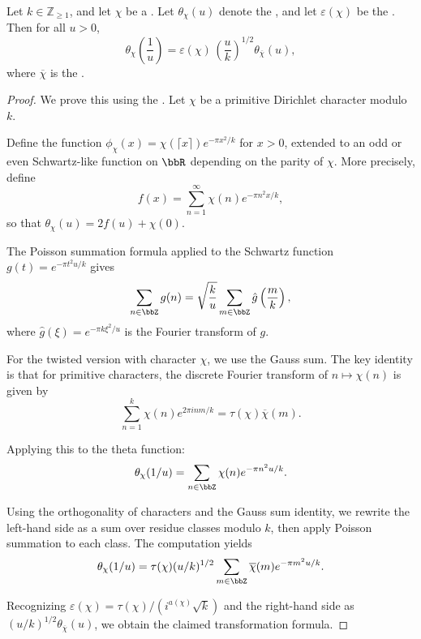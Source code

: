 \begin{lemma} \label{lemma:theta_transformation_formula_for_primitive_dirichlet_characters}
Let $k \in \mathbb{Z}_{\geq 1}$, and let $\chi$ be a . Let $\theta_\chi(u)$ denote the , and let $\varepsilon(\chi)$ be the . Then for all $u > 0$,
$$\theta_\chi\!\left( \frac{1}{u} \right) = \varepsilon(\chi) \, \left( \frac{u}{k} \right)^{\!1/2} \theta_{\overline{\chi}}(u),$$
where $\overline{\chi}$ is the .
\end{lemma}

\begin{proof}
    We prove this using the . Let $\chi$ be a primitive Dirichlet character modulo $k$.

    Define the function $\phi_\chi(x) = \chi(\lceil x \rceil) e^{-\pi x^2 / k}$ for $x > 0$, extended to an odd or even Schwartz-like function on $\bbR$ depending on the parity of $\chi$. More precisely, define
    $$f(x) = \sum_{n=1}^\infty \chi(n) e^{-\pi n^2 x / k},$$
    so that $\theta_\chi(u) = 2f(u) + \chi(0)$.

    The Poisson summation formula applied to the Schwartz function $g(t) = e^{-\pi t^2 u / k}$ gives
    $$\sum_{n \in \bbZ} g(n) = \sqrt{\frac{k}{u}} \sum_{m \in \bbZ} \hat{g}\left(\frac{m}{k}\right),$$
    where $\hat{g}(\xi) = e^{-\pi k \xi^2 / u}$ is the Fourier transform of $g$.

    For the twisted version with character $\chi$, we use the Gauss sum. The key identity is that for primitive characters, the discrete Fourier transform of $n \mapsto \chi(n)$ is given by
    $$\sum_{n=1}^k \chi(n) e^{2\pi i n m / k} = \tau(\chi)\overline{\chi}(m).$$

    Applying this to the theta function:
    $$\theta_\chi(1/u) = \sum_{n \in \bbZ} \chi(n) e^{-\pi n^2 u / k}.$$

    Using the orthogonality of characters and the Gauss sum identity, we rewrite the left-hand side as a sum over residue classes modulo $k$, then apply Poisson summation to each class. The computation yields
    $$\theta_\chi(1/u) = \tau(\chi)(u/k)^{1/2} \sum_{m \in \bbZ} \overline{\chi}(m) e^{-\pi m^2 u / k}.$$

    Recognizing $\varepsilon(\chi) = \tau(\chi)/(i^{a(\chi)}\sqrt{k})$ and the right-hand side as $(u/k)^{1/2}\theta_{\overline{\chi}}(u)$, we obtain the claimed transformation formula.
\end{proof}
